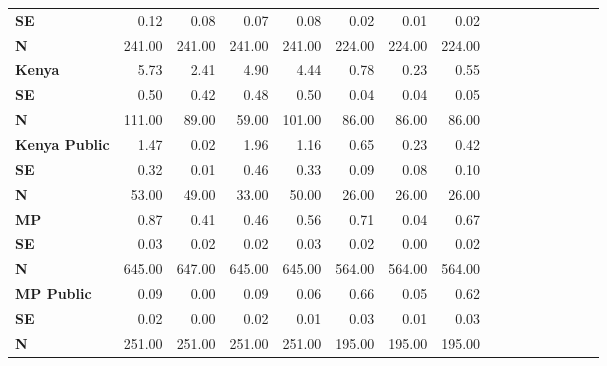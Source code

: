 \begin{tabular}{@{\extracolsep{5pt}}lrrrrrrrrrrrrrrr}
{\bf SE} & 0.12\phantom{***} & 0.08\phantom{***} & 0.07\phantom{***} & 0.08\phantom{***} & 0.02\phantom{***} & 0.01\phantom{***} & 0.02\phantom{***} \\
{\bf N} & 241.00\phantom{***} & 241.00\phantom{***} & 241.00\phantom{***} & 241.00\phantom{***} & 224.00\phantom{***} & 224.00\phantom{***} & 224.00\phantom{***} \\
{\bf Kenya} & 5.73\phantom{***} & 2.41\phantom{***} & 4.90\phantom{***} & 4.44\phantom{***} & 0.78\phantom{***} & 0.23\phantom{***} & 0.55\phantom{***} \\
{\bf SE} & 0.50\phantom{***} & 0.42\phantom{***} & 0.48\phantom{***} & 0.50\phantom{***} & 0.04\phantom{***} & 0.04\phantom{***} & 0.05\phantom{***} \\
{\bf N} & 111.00\phantom{***} & 89.00\phantom{***} & 59.00\phantom{***} & 101.00\phantom{***} & 86.00\phantom{***} & 86.00\phantom{***} & 86.00\phantom{***} \\
{\bf Kenya Public} & 1.47\phantom{***} & 0.02\phantom{***} & 1.96\phantom{***} & 1.16\phantom{***} & 0.65\phantom{***} & 0.23\phantom{***} & 0.42\phantom{***} \\
{\bf SE} & 0.32\phantom{***} & 0.01\phantom{***} & 0.46\phantom{***} & 0.33\phantom{***} & 0.09\phantom{***} & 0.08\phantom{***} & 0.10\phantom{***} \\
{\bf N} & 53.00\phantom{***} & 49.00\phantom{***} & 33.00\phantom{***} & 50.00\phantom{***} & 26.00\phantom{***} & 26.00\phantom{***} & 26.00\phantom{***} \\
{\bf MP} & 0.87\phantom{***} & 0.41\phantom{***} & 0.46\phantom{***} & 0.56\phantom{***} & 0.71\phantom{***} & 0.04\phantom{***} & 0.67\phantom{***} \\
{\bf SE} & 0.03\phantom{***} & 0.02\phantom{***} & 0.02\phantom{***} & 0.03\phantom{***} & 0.02\phantom{***} & 0.00\phantom{***} & 0.02\phantom{***} \\
{\bf N} & 645.00\phantom{***} & 647.00\phantom{***} & 645.00\phantom{***} & 645.00\phantom{***} & 564.00\phantom{***} & 564.00\phantom{***} & 564.00\phantom{***} \\
{\bf MP Public} & 0.09\phantom{***} & 0.00\phantom{***} & 0.09\phantom{***} & 0.06\phantom{***} & 0.66\phantom{***} & 0.05\phantom{***} & 0.62\phantom{***} \\
{\bf SE} & 0.02\phantom{***} & 0.00\phantom{***} & 0.02\phantom{***} & 0.01\phantom{***} & 0.03\phantom{***} & 0.01\phantom{***} & 0.03\phantom{***} \\
{\bf N} & 251.00\phantom{***} & 251.00\phantom{***} & 251.00\phantom{***} & 251.00\phantom{***} & 195.00\phantom{***} & 195.00\phantom{***} & 195.00\phantom{***} \\

\end{tabular}
